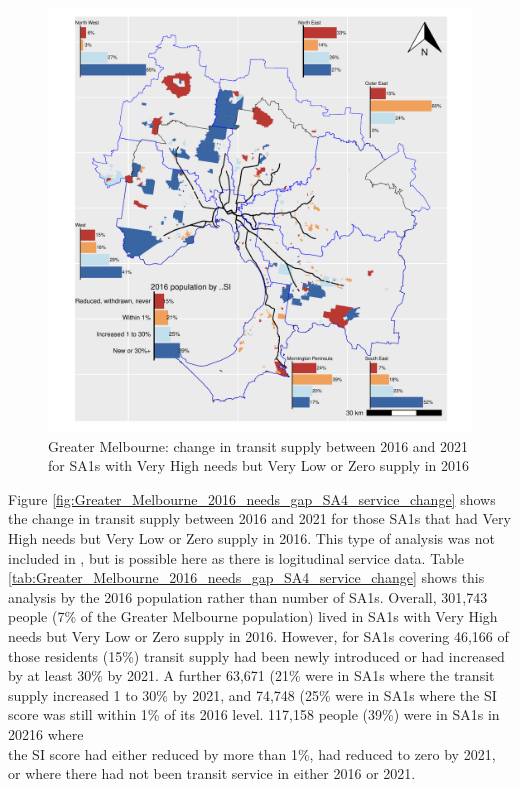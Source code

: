 \documentclass[preprint, 3p,
authoryear]{elsarticle} %
\begin{document}
\begin{figure}
\centering
\includegraphics{ReynoldsCurrieQu2024_files/figure-latex/Greater_Melbourne_2016_needs_gap_SA4_service_change-1.pdf}
\caption{Greater Melbourne: change in transit supply between 2016 and
2021 for SA1s with Very High needs but Very Low or Zero supply in 2016}
\end{figure}

Figure \ref{fig:Greater_Melbourne_2016_needs_gap_SA4_service_change}
shows the change in transit supply between 2016 and 2021 for those SA1s
that had Very High needs but Very Low or Zero supply in 2016. This type
of analysis was not included in \citet{currie2010identifying}, but is
possible here as there is logitudinal service data. Table
\ref{tab:Greater_Melbourne_2016_needs_gap_SA4_service_change} shows this
analysis by the 2016 population rather than number of SA1s. Overall,
301,743 people (7\% of the Greater Melbourne population) lived in SA1s
with Very High needs but Very Low or Zero supply in 2016. However, for
SA1s covering 46,166 of those residents (15\%) transit supply had been
newly introduced or had increased by at least 30\% by 2021. A further
63,671 (21\% were in SA1s where the transit supply increased 1 to 30\%
by 2021, and 74,748 (25\% were in SA1s where the SI score was still
within 1\% of its 2016 level. 117,158 people (39\%) were in SA1s in
20216 where\\
the SI score had either reduced by more than 1\%, had reduced to zero by
2021, or where there had not been transit service in either 2016 or
2021.
\end{document}
